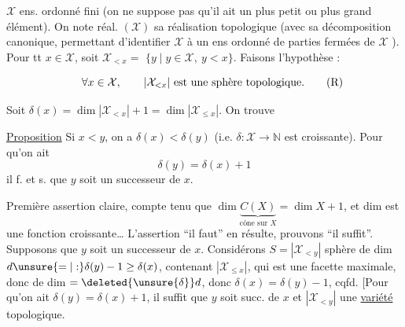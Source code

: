  $\mathcal X$ ens. ordonné fini (on ne suppose pas qu'il
ait un plus petit ou plus grand élément). On
note  réal. $(\mathcal X)$ sa réalisation topologique (avec sa
décomposition  canonique, permettant
d'identifier $\mathcal X$ à un ens ordonné de parties
fermées de $\mathcal X$ ). Pour tt $x\in\mathcal X$, soit
$\mathcal X_{<x}=$  $\{y\mid y\in\mathcal X,\ y<x\}$. Faisons l'hypothèse :

\[
\forall x\in\mathcal X,\qquad |\mathcal X_{<x}|\ \text{est une sphère topologique.}\tag*{\llap{\makebox[\displaywidth][l]{(R)}}}
\]

Soit $\delta(x)=\dim|\mathcal X_{<x}|+1=\dim|\mathcal X_{\leq x}|$. On trouve

\uline{Proposition} Si $x<y$, on a $\delta(x)<\delta(y)$ (i.e. $\delta:\mathcal X\to\mathbb N$
est  croissante). Pour qu'on ait 
\[
\delta(y)=\delta(x)+1
\]
il f. et s. que $y$ soit un successeur de $x$.

Première assertion claire,  compte tenu
que $\dim\underbrace{C(X)}_{\text{cône sur }X}=\dim X+1$, et dim est
une fonction croissante\ldots{} L'assertion ``il faut''
en résulte, prouvons ``il suffit''. Supposons que
$y$ soit un successeur de $x$. Considérons
$S=|\mathcal X_{<y}|$ sphère de dim $d\unsure{=|:}\delta(y)-1\geq\delta(x)$,
contenant $|\mathcal X_{\leq x}|$, qui est une facette
maximale, donc de dim $=\deleted{\unsure{\delta}}d$, donc $\delta(x)=\delta(y)-1$,
cqfd. [Pour qu'on ait $\delta(y)=\delta(x)+1$, il suffit que
$y$ soit succ. de $x$ et $|\mathcal X_{<y}|$ une \uline{variété} topologique.
